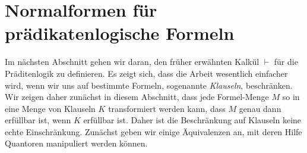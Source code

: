\section{Normalformen f\"{u}r pr\"{a}dikatenlogische Formeln}
Im n\"{a}chsten Abschnitt gehen wir daran, den fr\"uher  erw\"{a}hnten Kalk\"{u}l $\vdash$ f\"ur die
Pr\"aditenlogik zu definieren.  
Es zeigt sich, dass die Arbeit wesentlich einfacher wird, wenn wir uns auf bestimmte
Formeln, sogenannte {\emph{\color{blue}Klauseln}}, beschr\"{a}nken.  Wir zeigen daher zun\"{a}chst
in diesem Abschnitt, dass jede Formel-Menge $M$ so in eine Menge von Klauseln $K$ transformiert
werden kann, dass $M$ genau dann erf\"{u}llbar ist, wenn $K$ erf\"{u}llbar ist.  Daher ist die
Beschr\"{a}nkung auf Klauseln keine echte Einschr\"{a}nkung.  Zun\"{a}chst geben wir einige
\"{A}quivalenzen an, mit deren Hilfe Quantoren manipuliert werden k\"{o}nnen. 


